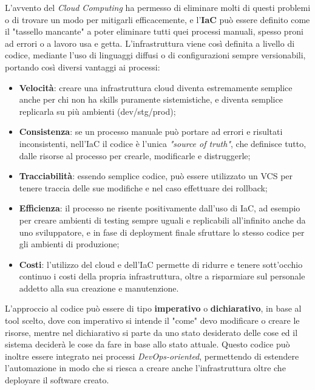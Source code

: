 \documentclass[../main.tex]{subfiles}
\begin{document}
            L'avvento del \emph{Cloud Computing} ha permesso di eliminare molti di questi problemi o di trovare un modo per mitigarli efficacemente, e l'\textbf{IaC} può essere definito come il "tassello mancante" a poter eliminare tutti quei processi manuali, spesso proni ad errori o a lavoro usa e getta. L'infrastruttura viene così definita a livello di codice, mediante l'uso di linguaggi diffusi o di configurazioni sempre versionabili, portando così diversi vantaggi ai processi:
            \begin{itemize}
                \item \textbf{Velocità}: creare una infrastruttura cloud diventa estremamente semplice anche per chi non ha skills puramente sistemistiche, e diventa semplice replicarla su più ambienti (dev/stg/prod);
                \item \textbf{Consistenza}: se un processo manuale può portare ad errori e risultati inconsistenti, nell'IaC il codice è l'unica \emph{"source of truth"}, che definisce tutto, dalle risorse al processo per crearle, modificarle e distruggerle;
                \item \textbf{Tracciabilità}: essendo semplice codice, può essere utilizzato un VCS per tenere traccia delle sue modifiche e nel caso effettuare dei rollback;
                \item \textbf{Efficienza}: il processo ne risente positivamente dall'uso di IaC, ad esempio per creare ambienti di testing sempre uguali e replicabili all'infinito anche da uno sviluppatore, e in fase di deployment finale sfruttare lo stesso codice per gli ambienti di produzione;
                \item \textbf{Costi}: l'utilizzo del cloud e dell'IaC permette di ridurre e tenere sott'occhio continuo i costi della propria infrastruttura, oltre a risparmiare sul personale addetto alla sua creazione e manutenzione.
            \end{itemize}
            
            L'approccio al codice può essere di tipo \textbf{imperativo} o \textbf{dichiarativo}, in base al tool scelto, dove con imperativo si intende il "come" devo modificare o creare le risorse, mentre nel dichiarativo si parte da uno stato desiderato delle cose ed il sistema deciderà le cose da fare in base allo stato attuale. Questo codice può inoltre essere integrato nei processi \emph{DevOps-oriented}, permettendo di estendere l'automazione in modo che si riesca a creare anche l'infrastruttura oltre che deployare il software creato.
            
\end{document}
